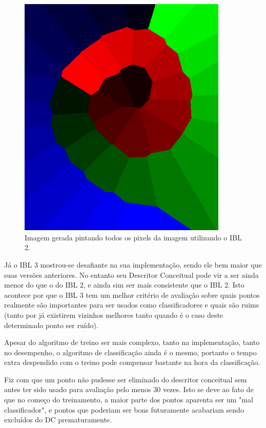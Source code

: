 \documentclass[12pt]{article}
\begin{document}
\begin{figure}[hb]
	\center
	\includegraphics[width=10cm]{./outputs/sequentialsimple.png}
	\caption{Imagem gerada pintando todos os pixels da imagem utilizando o IBL 2.}
\end{figure}

Já o IBL 3 mostrou-se desafiante na sua implementação, sendo ele bem maior que suas versões anteriores. No entanto seu Descritor Conceitual pode vir a ser ainda menor do que o do IBL 2, e ainda sim ser mais consistente que o IBL 2. Isto acontece por que o IBL 3 tem um melhor critério de avaliação sobre quais pontos realmente são importantes para ser usados como classificadores e quais são ruims (tanto por já existirem vizinhos melhores tanto quando é o caso deste determinado ponto ser ruído).

Apesar do algoritmo de treino ser mais complexo, tanto na implementação, tanto no desempenho, o algoritmo de classificação ainda é o mesmo, portanto o tempo extra despendido com o treino pode compensar bastante na hora da classificação.

Fiz com que um ponto não pudesse ser eliminado do descritor conceitual sem antes ter sido usado para avaliação pelo menos 30 vezes. Isto se deve ao fato de que no começo do treinamento, a maior parte dos pontos aparenta ser um "mal classificador", e pontos que poderiam ser bons futuramente acabariam sendo excluídos do DC prematuramente.
\end{document}
